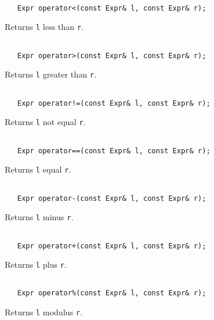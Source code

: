 \documentclass{article}
\begin{document}
\noindent
\hrulefill

\begin{verbatim}

   Expr operator<(const Expr& l, const Expr& r);

\end{verbatim}
Returns \texttt{l} less than \texttt{r}.

\noindent
\hrulefill

\begin{verbatim}

   Expr operator>(const Expr& l, const Expr& r);

\end{verbatim}
Returns \texttt{l} greater than \texttt{r}.

\noindent
\hrulefill

\begin{verbatim}

   Expr operator!=(const Expr& l, const Expr& r);

\end{verbatim}
Returns \texttt{l} not equal \texttt{r}.

\noindent
\hrulefill

\begin{verbatim}

   Expr operator==(const Expr& l, const Expr& r);

\end{verbatim}
Returns \texttt{l} equal \texttt{r}.

\noindent
\hrulefill

\begin{verbatim}

   Expr operator-(const Expr& l, const Expr& r);

\end{verbatim}
Returns \texttt{l} minus \texttt{r}.

\noindent
\hrulefill

\begin{verbatim}

   Expr operator+(const Expr& l, const Expr& r);

\end{verbatim}
Returns \texttt{l} plus \texttt{r}.

\noindent
\hrulefill

\begin{verbatim}

   Expr operator%(const Expr& l, const Expr& r);

\end{verbatim}
Returns \texttt{l} modulus \texttt{r}.
\end{document}
